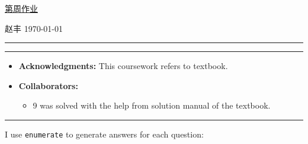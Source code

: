 \documentclass[a4paper]{article}
\begin{document}
\courseheader

\setcounter{hwcnt}{12} %

\begin{center}
  \underline{第\thehwcnt 周作业} \\
\end{center}
\begin{flushleft}
  赵丰\quad \studentID\hfill
  \today
\end{flushleft}
\hrule

\vspace{2em}

\flushleft
\rule{\textwidth}{1pt}
\begin{itemize}
\item {\bf Acknowledgments: \/} 
  This coursework refers to textbook.  
\item {\bf Collaborators: \/}
  \begin{itemize}
  \item 9 was solved with the help from solution manual of the textbook.    
  \end{itemize}
\end{itemize}
\rule{\textwidth}{1pt}

\vspace{2em}

I use \texttt{enumerate} to generate answers for each question:
\end{document}
